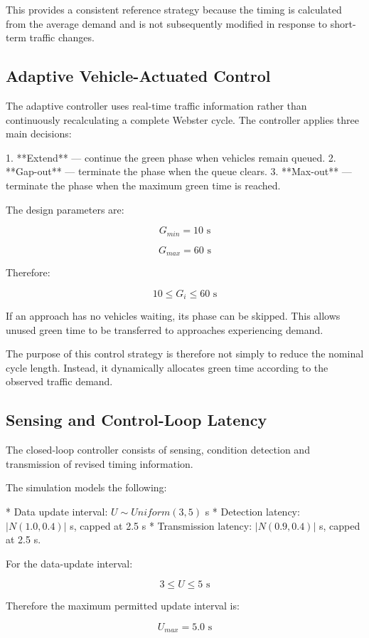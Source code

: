 \documentclass{article}
\begin{document}
This provides a consistent reference strategy because the timing is calculated from the average demand and is not subsequently modified in response to short-term traffic changes.

\subsection{Adaptive Vehicle-Actuated Control}

The adaptive controller uses real-time traffic information rather than continuously recalculating a complete Webster cycle. The controller applies three main decisions:

1. **Extend** — continue the green phase when vehicles remain queued.
2. **Gap-out** — terminate the phase when the queue clears.
3. **Max-out** — terminate the phase when the maximum green time is reached.

The design parameters are:

$$
G_{min}=10\text{ s}
$$

$$
G_{max}=60\text{ s}
$$

Therefore:

$$
10\leq G_i\leq60\text{ s}
$$

If an approach has no vehicles waiting, its phase can be skipped. This allows unused green time to be transferred to approaches experiencing demand.

The purpose of this control strategy is therefore not simply to reduce the nominal cycle length. Instead, it dynamically allocates green time according to the observed traffic demand.

\subsection{Sensing and Control-Loop Latency}

The closed-loop controller consists of sensing, condition detection and transmission of revised timing information.

The simulation models the following:

* Data update interval: \(U\sim Uniform(3,5)\) s
* Detection latency: \(|N(1.0,0.4)|\) s, capped at 2.5 s
* Transmission latency: \(|N(0.9,0.4)|\) s, capped at 2.5 s.

For the data-update interval:

$$
3\leq U\leq5\text{ s}
$$

Therefore the maximum permitted update interval is:

$$
U_{max}=5.0\text{ s}
$$
\end{document}
